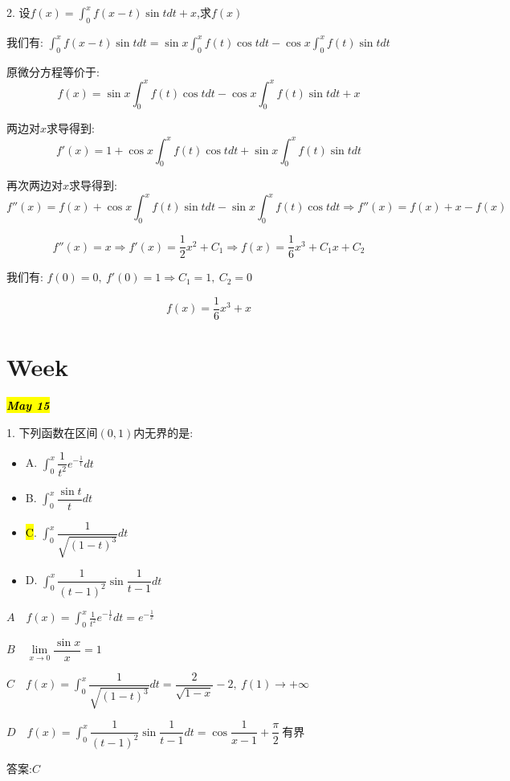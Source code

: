 2. 设$f(x)=\int_{0}^{x}f(x-t)\sin tdt+x$,求$f(x)$
\begin{solution}
	
	我们有: $\int_{0}^{x}f(x-t)\sin tdt=\sin x\int_{0}^{x}f(t)\cos tdt-\cos x\int_{0}^{x}f(t)\sin tdt$
	
	原微分方程等价于: 
	$$f(x)=\sin x\int_{0}^{x}f(t)\cos tdt-\cos x\int_{0}^{x}f(t)\sin tdt+x$$
	
	两边对$x$求导得到: 
	$$f'(x)=1+\cos x\int_{0}^{x}f(t)\cos tdt+\sin x\int_{0}^{x}f(t)\sin tdt$$
	
	再次两边对$x$求导得到: 
	$$f''(x)=f(x)+\cos x\int_{0}^{x}f(t)\sin tdt-\sin x\int_{0}^{x}f(t)\cos tdt\Rightarrow f''(x)=f(x)+x-f(x)$$
	
	$$f''(x)=x\Rightarrow f'(x)=\frac{1}{2}x^2+C_{1}\Rightarrow f(x)=\frac{1}{6}x^3+C_{1}x+C_{2}$$
	
	我们有: $f(0)=0,\ f'(0)=1\Rightarrow C_{1}=1,\ C_{2}=0$
	
	$$f(x)=\frac{1}{6}x^3+x$$
\end{solution}

\section{Week }
\hl{\textbf{\textit{May 15}}}

1. 下列函数在区间$(0,1)$内无界的是: 
\begin{itemize}
	\item A. $\int_{0}^{x}\dfrac{1}{t^2}e^{-\frac{1}{t}}dt$ 
	\item B. $\int_{0}^{x}\dfrac{\sin t}{t}dt$ 
	\item \hl{C}. $\int_{0}^{x}\dfrac{1}{\sqrt{(1-t)^3}}dt$ 
	\item D. $\int_{0}^{x}\dfrac{1}{(t-1)^2}\sin\dfrac{1}{t-1}dt$ 
\end{itemize}
\begin{solution}
	
	$A \quad f(x)=\int_{0}^{x}\frac{1}{t^2}e^{-\frac{1}{t}}dt=e^{-\frac{1}{x}}$
	
	$B \quad \lim\limits_{x\rightarrow 0}\dfrac{\sin x}{x}=1$
	
	$C \quad f(x)=\int_{0}^{x}\dfrac{1}{\sqrt{(1-t)^3}}dt=\dfrac{2}{\sqrt{1-x}}-2, \ f(1)\rightarrow+\infty$
	
	$D \quad f(x)=\int_{0}^{x}\dfrac{1}{(t-1)^2}\sin\dfrac{1}{t-1}dt=\cos \dfrac{1}{x-1}+\dfrac{\pi}{2}\  \text{有界}$
	
	答案:$C$
\end{solution}

